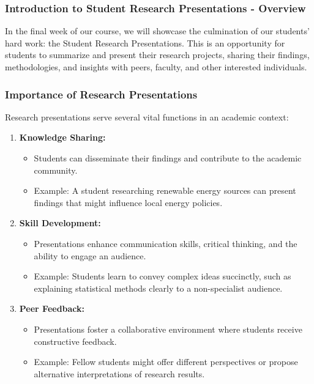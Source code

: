 \documentclass[aspectratio=169]{beamer}
\begin{document}
\frame{\titlepage}

\begin{frame}[fragile]
    \frametitle{Introduction to Student Research Presentations - Overview}
    In the final week of our course, we will showcase the culmination of our students' hard work: 
    the Student Research Presentations. This is an opportunity for students to summarize and present 
    their research projects, sharing their findings, methodologies, and insights with peers, faculty, 
    and other interested individuals.
\end{frame}

\begin{frame}[fragile]
    \frametitle{Importance of Research Presentations}
    Research presentations serve several vital functions in an academic context:
    
    \begin{enumerate}
        \item \textbf{Knowledge Sharing:}
            \begin{itemize}
                \item Students can disseminate their findings and contribute to the academic community.
                \item Example: A student researching renewable energy sources can present findings that might 
                influence local energy policies.
            \end{itemize}
        
        \item \textbf{Skill Development:}
            \begin{itemize}
                \item Presentations enhance communication skills, critical thinking, and the ability to engage 
                an audience.
                \item Example: Students learn to convey complex ideas succinctly, such as explaining statistical 
                methods clearly to a non-specialist audience.
            \end{itemize}
        
        \item \textbf{Peer Feedback:}
            \begin{itemize}
                \item Presentations foster a collaborative environment where students receive constructive feedback.
                \item Example: Fellow students might offer different perspectives or propose alternative interpretations 
                of research results.
            \end{itemize}
    \end{enumerate}
\end{frame}
\end{document}
